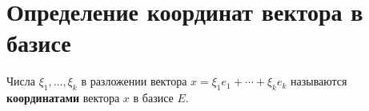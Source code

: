 \section{Определение координат вектора в базисе}

\begin{definition}
Числа $\xi_1, \ldots, \xi_k$ в разложении вектора $x = \xi_1 e_1 + \cdots + \xi_k e_k$ называются \textbf{координатами} вектора $x$ в базисе $E$.
\end{definition}
